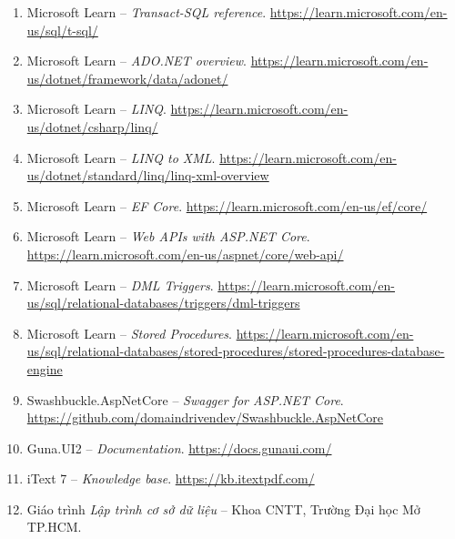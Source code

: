 \documentclass[12pt,a4paper]{report}
\begin{document}
\begin{enumerate}[leftmargin=*]
\item Microsoft Learn -- \textit{Transact-SQL reference}. \url{https://learn.microsoft.com/en-us/sql/t-sql/}
\item Microsoft Learn -- \textit{ADO.NET overview}. \url{https://learn.microsoft.com/en-us/dotnet/framework/data/adonet/}
\item Microsoft Learn -- \textit{LINQ}. \url{https://learn.microsoft.com/en-us/dotnet/csharp/linq/}
\item Microsoft Learn -- \textit{LINQ to XML}. \url{https://learn.microsoft.com/en-us/dotnet/standard/linq/linq-xml-overview}
\item Microsoft Learn -- \textit{EF Core}. \url{https://learn.microsoft.com/en-us/ef/core/}
\item Microsoft Learn -- \textit{Web APIs with ASP.NET Core}. \url{https://learn.microsoft.com/en-us/aspnet/core/web-api/}
\item Microsoft Learn -- \textit{DML Triggers}. \url{https://learn.microsoft.com/en-us/sql/relational-databases/triggers/dml-triggers}
\item Microsoft Learn -- \textit{Stored Procedures}. \url{https://learn.microsoft.com/en-us/sql/relational-databases/stored-procedures/stored-procedures-database-engine}
\item Swashbuckle.AspNetCore -- \textit{Swagger for ASP.NET Core}. \url{https://github.com/domaindrivendev/Swashbuckle.AspNetCore}
\item Guna.UI2 -- \textit{Documentation}. \url{https://docs.gunaui.com/}
\item iText 7 -- \textit{Knowledge base}. \url{https://kb.itextpdf.com/}
\item Giáo trình \textit{Lập trình cơ sở dữ liệu} -- Khoa CNTT, Trường Đại học Mở TP.HCM.
\end{enumerate}
\end{document}

